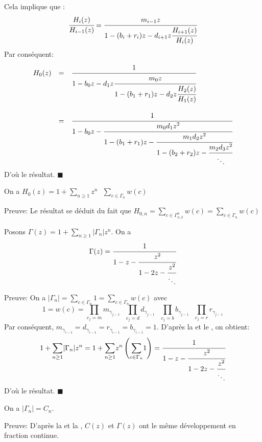 Cela implique que :\\
\[
	\cfrac{H_{i}(z)}{H_{i-1}(z)}=\cfrac{m_{i-1}z}{1-(b_{i}+r_{i})z-d_{i+1}z\cfrac{H_{i+1}(z)}{H_{i}(z)}}
\]
Par conséquent:
\[
	\begin{array}{r c l}
		H_{0}(z) & =       & \cfrac{1}{1-b_{0}z-d_{1}z\cfrac{m_{0}z}{1-(b_{1}+r_{1})z-d_{2}z\cfrac{H_{2}(z)}{H_{1}(z)}}}                   \\
		         & \text{} &                                                                                                               \\
		         & =       & \cfrac{1}{1-b_{0}z-\cfrac{m_{0}d_{1}z^2}{1-(b_{1}+r_{1})z-\cfrac{m_{1}d_{2}z^2}{1-(b_{2}+r_{2})z-\cfrac{m_{2}
			d_{3}z^2}{\ddots}}}}
	\end{array}
\]
D'où le résultat. \hspace{5pt}$\blacksquare$

\begin{corollaire} \label{H0(t)}
	On a $H_{0}(z) = 1 + \underset{n\geq 1}{\sum}z^{n}\text{ }\underset{c\in \Gamma_{n}}{\sum} w(c)$
\end{corollaire}
Preuve: Le résultat se déduit du fait que  $H_{0,n} = \underset{c\in \Gamma_{n,2}^{0}}{\sum}w(c) = \underset{c\in \Gamma_{n}}{\sum}w(c)$

\begin{proposition}\label{gamma-frac} Posons $\Gamma(z) = 1+\underset{n \geq 1}{\sum}|\Gamma_{n}|z^n $.
	On a \[\Gamma(z) = \cfrac{1}{1-z-\cfrac{z^2}{1-2z-\cfrac{z^2}{\ddots}}}\]
\end{proposition}
Preuve:
On a $|\Gamma_{n}| = \underset{c\in \Gamma_{n}}{\sum}1 = \underset{c\in \Gamma_{n}}{\sum}w(c) $ avec $$1=w(c)=\underset{c_{j}=m}{\prod}
	m_{\gamma_{j-1}}\text{ } \underset{c_{j}=d}{\prod}d_{\gamma_{j-1}}\text{ }\underset{c_{j}=b}{\prod}
	b_{\gamma_{j-1}}\text{ }\underset{c_{j}=r}{\prod}r_{\gamma_{j-1}}$$
Par conséquent,
$m_{\gamma_{i-1}}=d_{\gamma_{i-1}}=r_{\gamma_{i-1}}=b_{\gamma_{i-1}}=1$. D'après la  et le , on obtient:\\
$$
	1+\underset{n \geq 1}{\sum}|\Gamma_{n}|z^n = 1 + \underset{n \geq 1}{\sum}z^n \left(
	\underset{c\in \Gamma_{n}}{\sum}1  \right) = \cfrac{1}{1-z-\cfrac{z^2}{1-2z-
			\cfrac{z^2}{\ddots}}}
$$
D'où le résultat. \hspace{5pt}$\blacksquare$
\begin{corollaire}
	On a $|\Gamma_{n}|=C_{n}$.
\end{corollaire}
Preuve: D'après la  et la , $C(z)$ et $\Gamma(z)$ ont le même développement en fraction continue.\\

